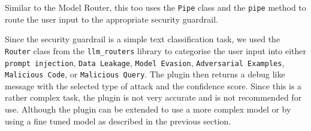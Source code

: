 Similar to the Model Router, this too uses the \texttt{Pipe} class and the \texttt{pipe} method to route the user input to the appropriate security guardrail.

Since the security guardrail is a simple text classification task, we used the \texttt{Router} class from the \texttt{llm\_routers} library to categorise the user input into either \texttt{prompt injection}, \texttt{Data Leakage}, \texttt{Model Evasion}, \texttt{Adversarial Examples}, \texttt{Malicious Code}, or \texttt{Malicious Query}. The plugin then returns a debug like message with the selected type of attack and the confidence score. Since this is a rather complex task, the plugin is not very accurate and is not recommended for use. Although the plugin can be extended to use a more complex model or by using a fine tuned model as described in the previous section.
